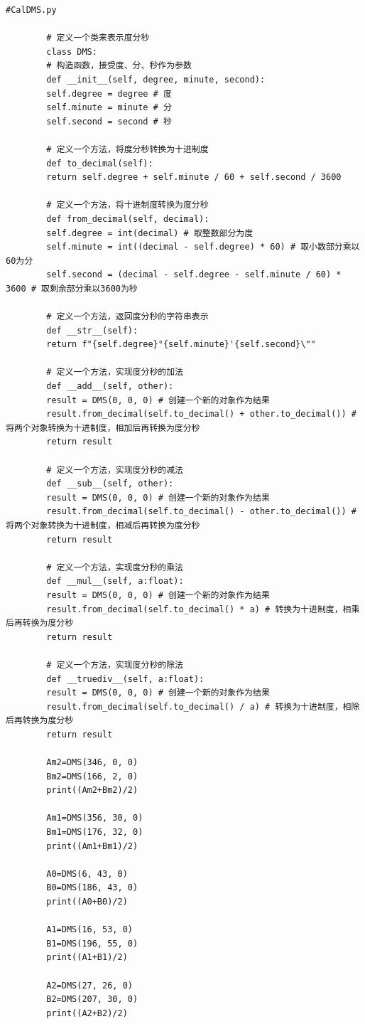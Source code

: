 \documentclass[dvipsnames, svgnames,a4paper,11pt]{article}
\begin{document}
	\begin{lstlisting}[style=pythonstyle,caption=代码记录]
		#CalDMS.py
		
		# 定义一个类来表示度分秒
		class DMS:
		# 构造函数，接受度、分、秒作为参数
		def __init__(self, degree, minute, second):
		self.degree = degree # 度
		self.minute = minute # 分
		self.second = second # 秒
		
		# 定义一个方法，将度分秒转换为十进制度
		def to_decimal(self):
		return self.degree + self.minute / 60 + self.second / 3600
		
		# 定义一个方法，将十进制度转换为度分秒
		def from_decimal(self, decimal):
		self.degree = int(decimal) # 取整数部分为度
		self.minute = int((decimal - self.degree) * 60) # 取小数部分乘以60为分
		self.second = (decimal - self.degree - self.minute / 60) * 3600 # 取剩余部分乘以3600为秒
		
		# 定义一个方法，返回度分秒的字符串表示
		def __str__(self):
		return f"{self.degree}°{self.minute}'{self.second}\""
		
		# 定义一个方法，实现度分秒的加法
		def __add__(self, other):
		result = DMS(0, 0, 0) # 创建一个新的对象作为结果
		result.from_decimal(self.to_decimal() + other.to_decimal()) # 将两个对象转换为十进制度，相加后再转换为度分秒
		return result
		
		# 定义一个方法，实现度分秒的减法
		def __sub__(self, other):
		result = DMS(0, 0, 0) # 创建一个新的对象作为结果
		result.from_decimal(self.to_decimal() - other.to_decimal()) # 将两个对象转换为十进制度，相减后再转换为度分秒
		return result
		
		# 定义一个方法，实现度分秒的乘法
		def __mul__(self, a:float):
		result = DMS(0, 0, 0) # 创建一个新的对象作为结果
		result.from_decimal(self.to_decimal() * a) # 转换为十进制度，相乘后再转换为度分秒
		return result
		
		# 定义一个方法，实现度分秒的除法
		def __truediv__(self, a:float):
		result = DMS(0, 0, 0) # 创建一个新的对象作为结果
		result.from_decimal(self.to_decimal() / a) # 转换为十进制度，相除后再转换为度分秒
		return result
		
		Am2=DMS(346, 0, 0)
		Bm2=DMS(166, 2, 0)
		print((Am2+Bm2)/2)
		
		Am1=DMS(356, 30, 0)
		Bm1=DMS(176, 32, 0)
		print((Am1+Bm1)/2)
		
		A0=DMS(6, 43, 0)
		B0=DMS(186, 43, 0)
		print((A0+B0)/2)
		
		A1=DMS(16, 53, 0)
		B1=DMS(196, 55, 0)
		print((A1+B1)/2)
		
		A2=DMS(27, 26, 0)
		B2=DMS(207, 30, 0)
		print((A2+B2)/2)
		

\end{lstlisting}
\end{document}
